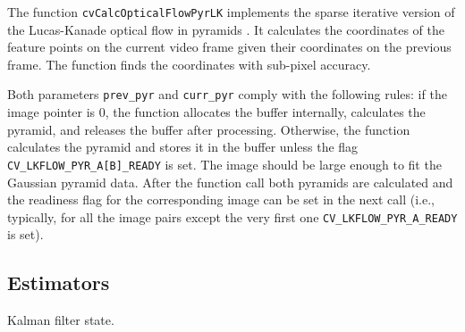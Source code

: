 The function \texttt{cvCalcOpticalFlowPyrLK} implements the sparse iterative version of the Lucas-Kanade optical flow in pyramids
. It calculates the coordinates of the feature points on the current video
frame given their coordinates on the previous frame. The function finds
the coordinates with sub-pixel accuracy.

Both parameters \texttt{prev\_pyr} and \texttt{curr\_pyr} comply with the
following rules: if the image pointer is 0, the function allocates the
buffer internally, calculates the pyramid, and releases the buffer after
processing. Otherwise, the function calculates the pyramid and stores
it in the buffer unless the flag \texttt{CV\_LKFLOW\_PYR\_A[B]\_READY}
is set. The image should be large enough to fit the Gaussian pyramid
data. After the function call both pyramids are calculated and the
readiness flag for the corresponding image can be set in the next call
(i.e., typically, for all the image pairs except the very first one
\texttt{CV\_LKFLOW\_PYR\_A\_READY} is set).

\subsection{Estimators}

\label{CvKalman}

Kalman filter state.

